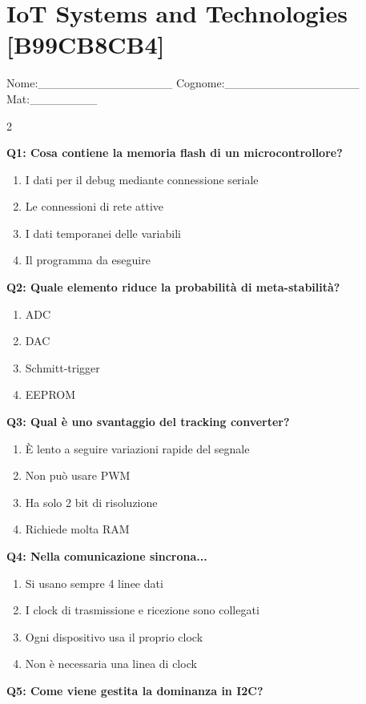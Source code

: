 \documentclass[10pt]{article}
\begin{document}
\newpage

\section*{IoT Systems and Technologies \footnotesize [B99CB8CB4]}
{\footnotesize Nome:\_\_\_\_\_\_\_\_\_\_\_\_\_\_\_\_ Cognome:\_\_\_\_\_\_\_\_\_\_\_\_\_\_\_\_ Mat:\_\_\_\_\_\_\_\_}
\begin{multicols}{2}

\textbf{Q1: Cosa contiene la memoria flash di un microcontrollore?}

\begin{enumerate}[label=\arabic*.]
\item I dati per il debug mediante connessione seriale
\item Le connessioni di rete attive
\item I dati temporanei delle variabili
\item Il programma da eseguire
\end{enumerate}
\textbf{Q2: Quale elemento riduce la probabilità di meta-stabilità?}

\begin{enumerate}[label=\arabic*.]
\item ADC
\item DAC
\item Schmitt-trigger
\item EEPROM
\end{enumerate}
\textbf{Q3: Qual è uno svantaggio del tracking converter?}

\begin{enumerate}[label=\arabic*.]
\item È lento a seguire variazioni rapide del segnale
\item Non può usare PWM
\item Ha solo 2 bit di risoluzione
\item Richiede molta RAM
\end{enumerate}
\textbf{Q4: Nella comunicazione sincrona...}

\begin{enumerate}[label=\arabic*.]
\item Si usano sempre 4 linee dati
\item I clock di trasmissione e ricezione sono collegati
\item Ogni dispositivo usa il proprio clock
\item Non è necessaria una linea di clock
\end{enumerate}
\textbf{Q5: Come viene gestita la dominanza in I2C?}


\end{multicols}
\end{document}
